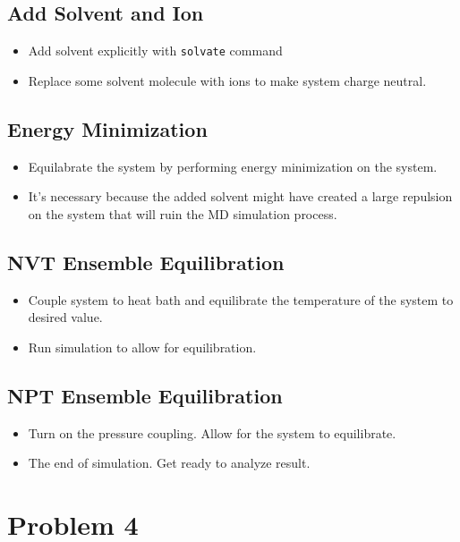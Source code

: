 \documentclass[11pt]{article}
\begin{document}
\subsection{Add Solvent and Ion}
\label{sec:org7acd20e}
\begin{itemize}
\item Add solvent explicitly with \texttt{solvate} command
\item Replace some solvent molecule with ions to make system charge neutral.
\end{itemize}

\subsection{Energy Minimization}
\label{sec:orged4632b}
\begin{itemize}
\item Equilabrate the system by performing energy minimization on the system.
\item It's necessary because the added solvent might have created a large repulsion
on the system that will ruin the MD simulation process.
\end{itemize}

\subsection{NVT Ensemble Equilibration}
\label{sec:orga9dd545}
\begin{itemize}
\item Couple system to heat bath and equilibrate the temperature of the system to
desired value.
\item Run simulation to allow for equilibration.
\end{itemize}

\subsection{NPT Ensemble Equilibration}
\label{sec:org7345c40}
\begin{itemize}
\item Turn on the pressure coupling. Allow for the system to equilibrate.
\item The end of simulation. Get ready to analyze result.
\end{itemize}

\section{Problem 4}
\label{sec:orgfad0327}
\end{document}
